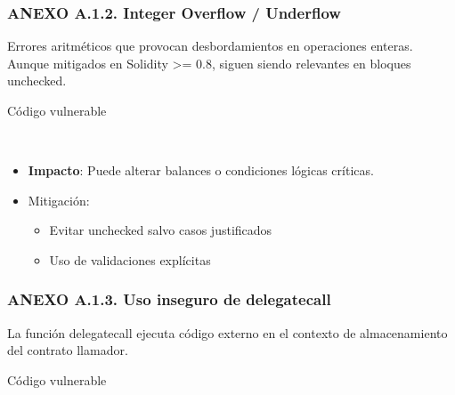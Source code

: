 \subsubsection{ANEXO A.1.2. Integer Overflow /
Underflow}\label{anexo-a.1.2.-integer-overflow-underflow}

Errores aritméticos que provocan desbordamientos en operaciones enteras.
Aunque mitigados en Solidity \textgreater= 0.8, siguen siendo relevantes
en bloques unchecked.

Código vulnerable

\begin{Shaded}
\begin{Highlighting}[]
 


        \OperatorTok{+} \OperatorTok{;}

\NormalTok{    \}}

\NormalTok{\}}
\end{Highlighting}
\end{Shaded}

\begin{itemize}
\tightlist
\item
  \textbf{Impacto}: Puede alterar balances o condiciones lógicas
  críticas.
\item
  Mitigación:

  \begin{itemize}
  \tightlist
  \item
    Evitar unchecked salvo casos justificados
  \item
    Uso de validaciones explícitas
  \end{itemize}
\end{itemize}

\subsubsection{ANEXO A.1.3. Uso inseguro de
delegatecall}\label{anexo-a.1.3.-uso-inseguro-de-delegatecall}

La función delegatecall ejecuta código externo en el contexto de
almacenamiento del contrato llamador.

Código vulnerable

